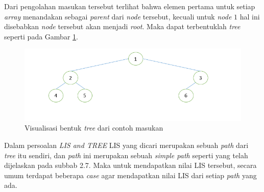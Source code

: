 \quad Dari pengolahan masukan tersebut terlihat bahwa elemen pertama untuk setiap \textit{array} menandakan sebagai \textit{parent} dari \textit{node} tersebut, kecuali untuk \textit{node} $1$ hal ini disebabkan \textit{node} tersebut akan menjadi \textit{root}. Maka dapat terbentuklah \textit{tree} seperti pada Gambar \ref{figure:treeinput}. 
\begin{figure}[H]
	\centerline{ \includegraphics[scale=0.39]{assets/images/Tree_input.PNG}}
	\caption{Visualisasi bentuk \textit{tree} dari contoh masukan}
	\label{figure:treeinput}
\end{figure}
\quad Dalam persoalan \textit{LIS and TREE} LIS yang dicari merupakan sebuah \textit{path} dari \textit{tree} itu sendiri, dan \textit{path} ini merupakan sebuah \textit{simple path} seperti yang telah dijelaskan pada subbab 2.7. Maka untuk mendapatkan nilai LIS tersebut, secara umum terdapat beberapa \textit{case} agar mendapatkan nilai LIS dari setiap \textit{path} yang ada.

